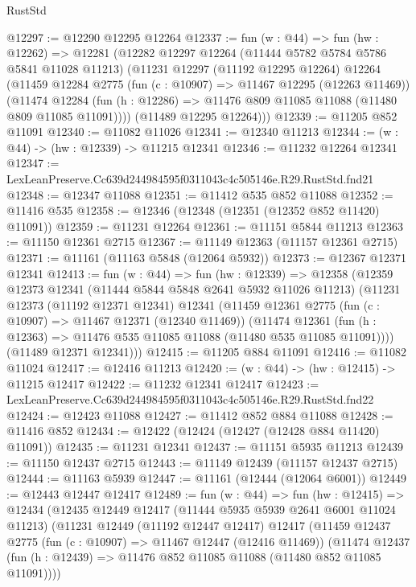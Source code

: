 \begin{lexlean}{RustStd}
\begin{coremodule}
@12297 := @12290 @12295 @12264
@12337 := fun (w : @44) =>
  fun (hw : @12262) =>
  @12281
    (@12282
      @12297
      @12264
      (@11444 @5782 @5784 @5786 @5841 @11028 @11213)
      (@11231
        @12297
        (@11192 @12295 @12264)
        @12264
        (@11459
          @12284
          @2775
          (fun (c : @10907) => @11467 @12295 (@12263 @11469))
          (@11474
            @12284
            (fun (h : @12286) => @11476 @809 @11085 @11088 (@11480 @809 @11085 @11091))))
        (@11489 @12295 @12264)))
@12339 := @11205 @852 @11091
@12340 := @11082 @11026
@12341 := @12340 @11213
@12344 := (w : @44) -> (hw : @12339) -> @11215 @12341
@12346 := @11232 @12264 @12341
@12347 := LexLeanPreserve.Cc639d244984595f0311043c4c505146e.R29.RustStd.fnd21
@12348 := @12347 @11088
@12351 := @11412 @535 @852 @11088
@12352 := @11416 @535
@12358 := @12346 (@12348 (@12351 (@12352 @852 @11420) @11091))
@12359 := @11231 @12264
@12361 := @11151 @5844 @11213
@12363 := @11150 @12361 @2715
@12367 := @11149 @12363 (@11157 @12361 @2715)
@12371 := @11161 (@11163 @5848 (@12064 @5932))
@12373 := @12367 @12371 @12341
@12413 := fun (w : @44) =>
  fun (hw : @12339) =>
  @12358
    (@12359
      @12373
      @12341
      (@11444 @5844 @5848 @2641 @5932 @11026 @11213)
      (@11231
        @12373
        (@11192 @12371 @12341)
        @12341
        (@11459
          @12361
          @2775
          (fun (c : @10907) => @11467 @12371 (@12340 @11469))
          (@11474
            @12361
            (fun (h : @12363) => @11476 @535 @11085 @11088 (@11480 @535 @11085 @11091))))
        (@11489 @12371 @12341)))
@12415 := @11205 @884 @11091
@12416 := @11082 @11024
@12417 := @12416 @11213
@12420 := (w : @44) -> (hw : @12415) -> @11215 @12417
@12422 := @11232 @12341 @12417
@12423 := LexLeanPreserve.Cc639d244984595f0311043c4c505146e.R29.RustStd.fnd22
@12424 := @12423 @11088
@12427 := @11412 @852 @884 @11088
@12428 := @11416 @852
@12434 := @12422 (@12424 (@12427 (@12428 @884 @11420) @11091))
@12435 := @11231 @12341
@12437 := @11151 @5935 @11213
@12439 := @11150 @12437 @2715
@12443 := @11149 @12439 (@11157 @12437 @2715)
@12444 := @11163 @5939
@12447 := @11161 (@12444 (@12064 @6001))
@12449 := @12443 @12447 @12417
@12489 := fun (w : @44) =>
  fun (hw : @12415) =>
  @12434
    (@12435
      @12449
      @12417
      (@11444 @5935 @5939 @2641 @6001 @11024 @11213)
      (@11231
        @12449
        (@11192 @12447 @12417)
        @12417
        (@11459
          @12437
          @2775
          (fun (c : @10907) => @11467 @12447 (@12416 @11469))
          (@11474
            @12437
            (fun (h : @12439) => @11476 @852 @11085 @11088 (@11480 @852 @11085 @11091))))

\end{coremodule}
\end{lexlean}
